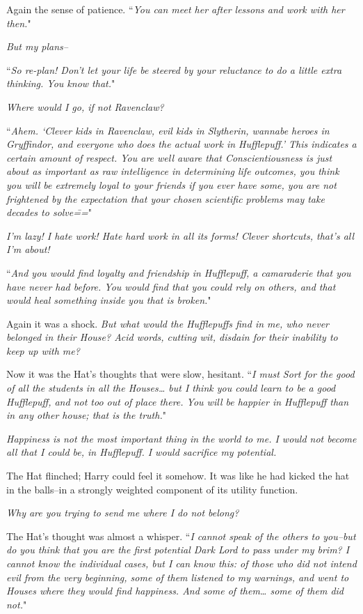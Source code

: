 Again the sense of patience. ``\emph{You can meet her after lessons and work with her then.}"

\emph{But my plans\---}

``\emph{So re-plan! Don't let your life be steered by your reluctance to do a little extra thinking. You \emph{know} that.}"

\emph{Where would I go, if not Ravenclaw?}

``\emph{Ahem. `Clever kids in Ravenclaw, evil kids in Slytherin, wannabe heroes in Gryffindor, and everyone who does the actual work in Hufflepuff.' This indicates a certain amount of respect. You are well aware that Conscientiousness is just about as important as raw intelligence in determining life outcomes, you think you will be extremely loyal to your friends if you ever have some, you are not frightened by the expectation that your chosen scientific problems may take decades to solve\===}"

\emph{I'm lazy! I hate work! Hate hard work in all its forms! Clever shortcuts, that's all I'm about!}

``\emph{And you would find loyalty and friendship in Hufflepuff, a camaraderie that you have never had before. You would find that you could rely on others, and that would heal something inside you that is broken.}"

Again it was a shock. \emph{But what would the Hufflepuffs find in \emph{me}, who never belonged in their House? Acid words, cutting wit, disdain for their inability to keep up with me?}

Now it was the Hat's thoughts that were slow, hesitant. ``\emph{I must Sort for the good of all the students in all the Houses{\ldots} but I think you could learn to be a good Hufflepuff, and not too out of place there. You will be happier in Hufflepuff than in any other house; that is the truth.}"

\emph{Happiness is not the most important thing in the world to me. I would not become all that I could be, in Hufflepuff. I would sacrifice my potential.}

The Hat flinched; Harry could feel it somehow. It was like he had kicked the hat in the balls\---in a strongly weighted component of its utility function.

\emph{Why are you trying to send me where I do not belong?}

The Hat's thought was almost a whisper. ``\emph{I cannot speak of the others to you\---but do you think that you are the first potential Dark Lord to pass under my brim? I cannot know the individual cases, but I can know this: of those who did not intend evil from the very beginning, some of them listened to my warnings, and went to Houses where they would find happiness. And some of them{\ldots} some of them did not.}"


